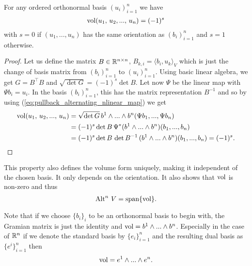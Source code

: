 \documentclass[../master_thesis.tex]{subfiles}
\begin{document}
\begin{proposition}
    For any ordered
    orthonormal basis $(u_i)_{i=1}^n$ we have 
    \begin{align*}
        \operatorname{vol} (u_1,\,u_2,...,\,u_n) = (-1)^s
    \end{align*}
    with $s=0$ if $(u_1,...,u_n)$ has the same orientation as $(b_i)_{i=1}^n$ 
    and $s=1$ otherwise. 
\end{proposition}
\begin{proof}
    Let us define the matrix $B \in \mathbb{R}^{n\times n}$, $B_{k,i} = \langle b_i, u_k
    \rangle_V$ which is just the change of basis matrix from $( b_i )_{i=1}^n$ 
    to $( u_i )_{i=1}^n$. 
    Using basic linear algebra, we get
    $ G = B^\top B$ and 
    $\sqrt{\det G} = (-1)^s \det B$. Let now $\Psi$ be the linear map with 
    $\Psi b_i = u_i$. In the basis $( b_i )_{i=1}^n$, this has the matrix 
    representation $B^{-1}$ and so by using 
    (\ref{eq:pullback_alternating_nlinear_map}) we get
    \begin{align*}
        \operatorname{vol} (u_1,\,u_2,...,\,u_n) &= \sqrt{ \det G} \, b^1 \wedge ... \wedge b^n 
        ( \Psi b_1,..., \Psi b_n )
        \\ &= (-1)^s \det B \, \Psi^* (b^1 \wedge ... \wedge b^n )( b_1,..., b_n) 
        \\ &= (-1)^s \det B \, \det B^{-1} \, (b^1 \wedge ... \wedge b^n )( b_1,..., b_n)
        = (-1)^s.
    \end{align*}
\end{proof}
This property also defines the volume form uniquely, making it independent of the 
chosen basis. It only depends on the orientation.
It also shows that $\operatorname{vol}$ is non-zero and thus 
\begin{align*}
    {\operatorname{Alt}^{n}\,V} = \text{span} \{ \operatorname{vol} \}.
\end{align*}

Note that if we choose $\{ b_i \}_{i}$ to be an orthonormal basis to begin 
with, the Gramian matrix is just the identity and 
$\operatorname{vol} = b^1 \wedge ... \wedge b^n$. Especially in the case of $\mathbb{R}^n$ if 
we denote the standard basis by $\{ e_i \}_{i=1}^n$ and the resulting 
dual basis as $\{ e^i \}_{i=1}^n$ then 
\begin{align*}
    \operatorname{vol} = e^1 \wedge ... \wedge e^n.
\end{align*}
\end{document}

